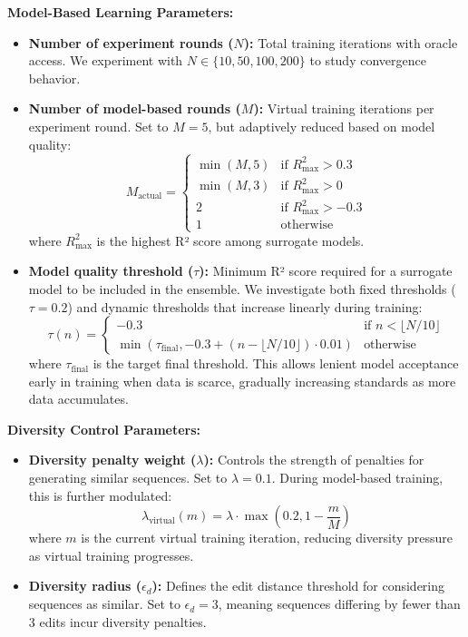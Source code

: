 \documentclass[conference]{IEEEtran}
\begin{document}
\textbf{Model-Based Learning Parameters:}
\begin{itemize}
    \item \textbf{Number of experiment rounds ($N$):} Total training iterations with oracle access. We experiment with $N \in \{10, 50, 100, 200\}$ to study convergence behavior.
    
    \item \textbf{Number of model-based rounds ($M$):} Virtual training iterations per experiment round. Set to $M = 5$, but adaptively reduced based on model quality:
    \begin{equation}
    M_{\text{actual}} = \begin{cases}
    \min(M, 5) & \text{if } R^2_{\max} > 0.3 \\
    \min(M, 3) & \text{if } R^2_{\max} > 0 \\
    2 & \text{if } R^2_{\max} > -0.3 \\
    1 & \text{otherwise}
    \end{cases}
    \end{equation}
    where $R^2_{\max}$ is the highest R² score among surrogate models.
    
    \item \textbf{Model quality threshold ($\tau$):} Minimum R² score required for a surrogate model to be included in the ensemble. We investigate both fixed thresholds ($\tau = 0.2$) and dynamic thresholds that increase linearly during training:
    \begin{equation}
    \tau(n) = \begin{cases}
    -0.3 & \text{if } n < \lfloor N/10 \rfloor \\
    \min(\tau_{\text{final}}, -0.3 + (n - \lfloor N/10 \rfloor) \cdot 0.01) & \text{otherwise}
    \end{cases}
    \end{equation}
    where $\tau_{\text{final}}$ is the target final threshold. This allows lenient model acceptance early in training when data is scarce, gradually increasing standards as more data accumulates.
\end{itemize}

\textbf{Diversity Control Parameters:}
\begin{itemize}
    \item \textbf{Diversity penalty weight ($\lambda$):} Controls the strength of penalties for generating similar sequences. Set to $\lambda = 0.1$. During model-based training, this is further modulated:
    \begin{equation}
    \lambda_{\text{virtual}}(m) = \lambda \cdot \max\left(0.2, 1 - \frac{m}{M}\right)
    \end{equation}
    where $m$ is the current virtual training iteration, reducing diversity pressure as virtual training progresses.
    
    \item \textbf{Diversity radius ($\epsilon_d$):} Defines the edit distance threshold for considering sequences as similar. Set to $\epsilon_d = 3$, meaning sequences differing by fewer than 3 edits incur diversity penalties.
\end{itemize}
\end{document}
